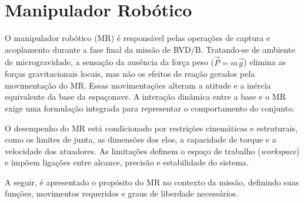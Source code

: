 \section{Manipulador Robótico}
\label{sec:manipulador_robotico}

O manipulador robótico (MR) é responsável pelas operações de captura e acoplamento durante a fase final da missão de RVD/B.
Tratando-se de ambiente de microgravidade, a sensação da ausência da força peso ($\vec P = m \vec g$) elimina as forças gravitacionais locais, mas não os efeitos de reação gerados pela movimentação do MR.
Essas movimentações alteram a atitude e a inércia equivalente da base da espaçonave.
A interação dinâmica entre a base e o MR exige uma formulação integrada para representar o comportamento do conjunto.

O desempenho do MR está condicionado por restrições cinemáticas e estruturais, como os limites de junta, as dimensões dos elos, a capacidade de torque e a velocidade dos atuadores.
As limitações definem o espaço de trabalho (\emph{workspace}) e impõem ligações entre alcance, precisão e estabilidade do sistema.

A seguir, é apresentado o propósito do MR no contexto da missão, definindo suas funções, movimentos requeridos e graus de liberdade necessários.









% 
% 
% 
% 
% 